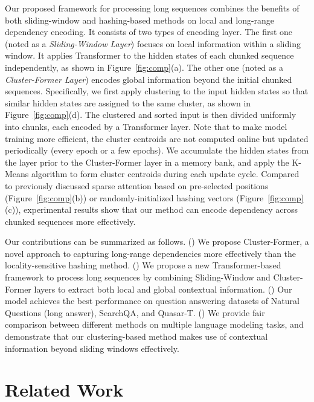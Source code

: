 \documentclass[11pt,a4paper]{article}
\begin{document}
Our proposed framework for processing long sequences combines the benefits of both sliding-window and hashing-based methods on local and long-range dependency encoding.
It consists of two types of encoding layer.
The first one (noted as a \textit{Sliding-Window Layer}) focuses on local information within a sliding window. It applies Transformer to the hidden states of each chunked sequence independently, as shown in Figure~\ref{fig:comp}(a).
The other one (noted as a \textit{Cluster-Former Layer}) encodes global information beyond the initial chunked sequences.
Specifically, we first apply clustering to the input hidden states
so that similar hidden states are assigned to the same cluster, as shown in Figure~\ref{fig:comp}(d). The clustered and sorted input is then divided uniformly into chunks, each encoded by a Transformer layer. 
Note that to make model training more efficient, the cluster centroids are not computed online but updated periodically (every epoch or a few epochs).
We accumulate the hidden states from the layer prior to the Cluster-Former layer in a memory bank, and apply the K-Means algorithm to form cluster centroids during each update cycle.
Compared to previously discussed sparse attention based on pre-selected positions (Figure~\ref{fig:comp}(b)) or randomly-initialized hashing vectors (Figure~\ref{fig:comp}(c)), experimental results show that our method can encode dependency across chunked sequences more effectively.


Our contributions can be summarized as follows.
() We propose Cluster-Former, a novel approach to capturing long-range dependencies more effectively than the locality-sensitive hashing method.
() We propose a new Transformer-based framework to process long sequences by combining Sliding-Window and Cluster-Former layers to extract both local and global contextual information. 
() Our model achieves the best performance on question answering datasets of Natural Questions (long answer), SearchQA, and Quasar-T. 
() We provide fair comparison between different methods on multiple language modeling tasks, and demonstrate that our clustering-based method makes use of contextual information beyond sliding windows effectively.
 
\section{Related Work}
\end{document}
